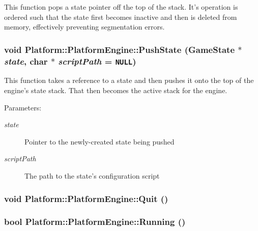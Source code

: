 This function pops a state pointer off the top of the stack. It's operation is ordered such that the state first becomes inactive and then is deleted from memory, effectively preventing segmentation errors. \hypertarget{class_platform_1_1_platform_engine_e9bbdbfed8a9d99bc89f21cee4b15bfd}{
\subsubsection[{PushState}]{\setlength{\rightskip}{0pt plus 5cm}void Platform::PlatformEngine::PushState ({\bf GameState} $\ast$ {\em state}, \/  char $\ast$ {\em scriptPath} = {\tt NULL})}}
\label{d2/dd5/class_platform_1_1_platform_engine_e9bbdbfed8a9d99bc89f21cee4b15bfd}


This function takes a reference to a state and then pushes it onto the top of the engine's state stack. That then becomes the active stack for the engine.

\begin{Desc}
\item[Parameters:]
\begin{description}
\item[{\em state}]Pointer to the newly-created state being pushed \item[{\em scriptPath}]The path to the state's configuration script \end{description}
\end{Desc}
\hypertarget{class_platform_1_1_platform_engine_e65f082e457e8d7dab762f7ab6b6d82b}{
\subsubsection[{Quit}]{\setlength{\rightskip}{0pt plus 5cm}void Platform::PlatformEngine::Quit ()}}
\label{d2/dd5/class_platform_1_1_platform_engine_e65f082e457e8d7dab762f7ab6b6d82b}


\hypertarget{class_platform_1_1_platform_engine_a89b32e154a653388cc42f5b9a582f59}{
\subsubsection[{Running}]{\setlength{\rightskip}{0pt plus 5cm}bool Platform::PlatformEngine::Running ()}}
\label{d2/dd5/class_platform_1_1_platform_engine_a89b32e154a653388cc42f5b9a582f59}


